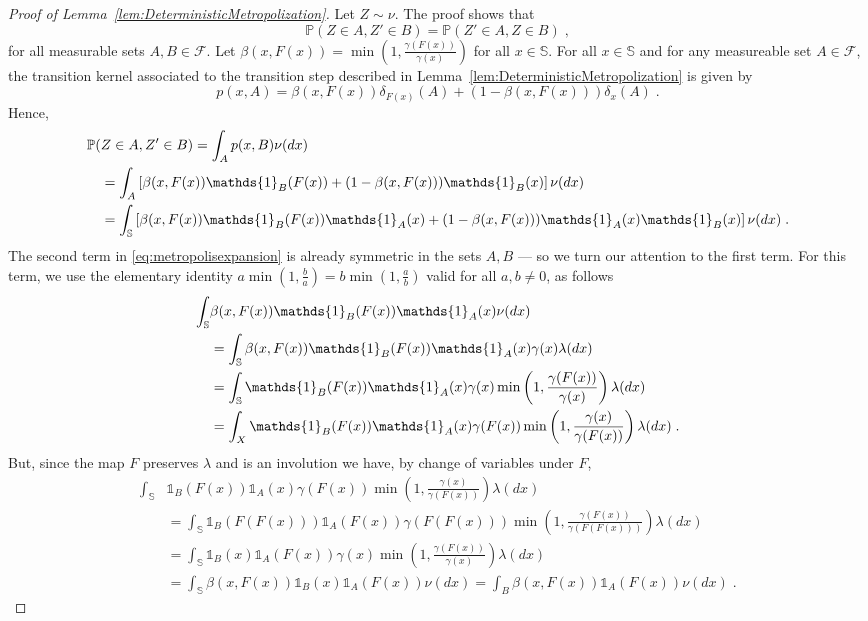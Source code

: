\documentclass[letterpaper,11pt]{article}
\theoremstyle{plain}%
\theoremstyle{remark}
\newcommand{\prb}{\mathbb{P}}
\begin{document}
\begin{proof}[Proof of Lemma~\ref{lem:DeterministicMetropolization}]
Let $Z \sim \nu$.  The proof shows that \[
\prb(Z  \in A , Z' \in B) =  \prb(Z'  \in A , Z \in B) \;, 
\] 
for all measurable sets $A,B \in \mathcal{F}$.
Let $\beta(x,F(x)) = \min \left(1, \frac{\gamma(F(x))}{\gamma(x)} \right)$ for all $x \in \mathbb{S}$. For all $x \in \mathbb{S}$ and for any measureable set $A \in \mathcal{F}$, the  transition kernel associated to the transition step described in Lemma~\ref{lem:DeterministicMetropolization} is given by \[
p(x, A) = \beta(x,F(x)) \delta_{F(x)}(A) + (1 - \beta(x, F(x))) \delta_{x}(A) \;.
\] Hence,
\begin{align}
\prb( & Z  \in A , Z' \in B) = \int_A p(x,B) \nu(dx) \notag \\
&= \int_A \left[ \beta(x, F(x)) \mathds{1}_B(F(x)) + (1 - \beta(x,F(x))) \mathds{1}_B(x) \right] \nu(dx) \label{eq:metrodef} \\
&= \int_\mathbb{S} \left[ \beta(x, F(x)) \mathds{1}_B(F(x)) \mathds{1}_A(x) + (1 - \beta(x,F(x)))\mathds{1}_A(x)\mathds{1}_B(x) \right] \nu(dx) \;. \label{eq:metropolisexpansion}
\end{align}
The second term in \eqref{eq:metropolisexpansion} is already symmetric in the sets $A,B$ --- so we turn our attention to the first term. For this term, we use the elementary identity $a \min(1, \frac{b}{a}) = b \min(1, \frac{a}{b})$ valid for all $a, b \ne 0$, as follows  \begin{align}
\int_\mathbb{S} & \beta(x, F(x)) \mathds{1}_B(F(x)) \mathds{1}_A(x) \nu(dx)  \nonumber \\
&= \int_\mathbb{S} \beta(x, F(x)) \mathds{1}_B(F(x)) \mathds{1}_A(x) \gamma(x) \lambda(dx) \notag \\
&= \int_\mathbb{S} \mathds{1}_B(F(x)) \mathds{1}_A(x) \gamma(x) \min \left(1, \frac{\gamma(F(x))}{\gamma(x)} \right) \lambda (dx) \notag \\
&= \int_X \mathds{1}_B(F(x)) \mathds{1}_A(x) \gamma(F(x)) \min \left(1, \frac{\gamma(x)}{\gamma(F(x))} \right) \lambda (dx) \;. \notag 
\end{align}
But, since the map $F$ preserves $\lambda$ and is an involution we have, by change of variables under $F$,
\begin{align}
 \int_\mathbb{S} & \mathds{1}_B(F(x)) \mathds{1}_A(x) \gamma(F(x)) \min \left(1, \frac{\gamma(x)}{\gamma(F(x))} \right) \lambda (dx) \nonumber \\
& = \int_\mathbb{S} \mathds{1}_B(F(F(x))) \mathds{1}_A(F(x)) \gamma(F(F(x))) \min \left(1, \frac{\gamma(F(x))}{\gamma(F(F(x)))} \right) \lambda (dx) \nonumber  \\
&=\int_{\mathbb{S}}  \mathds{1}_B(x) \mathds{1}_A(F(x)) \gamma(x) \min \left(1, \frac{\gamma(F(x))}{\gamma(x)} \right) \lambda (dx) \nonumber  \\
&=\int_{\mathbb{S}} \beta(x, F(x)) \mathds{1}_B(x) \mathds{1}_A(F(x))  \nu (dx) =\int_B \beta(x, F(x))  \mathds{1}_A(F(x))  \nu (dx) \;.
\label{eq:metroaftercov}
\end{align}


\end{proof}
\end{document}
